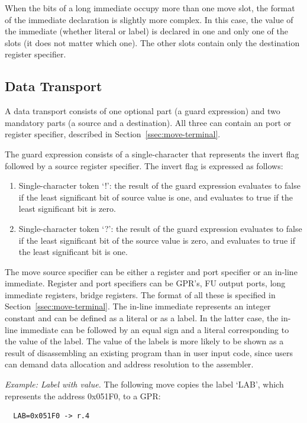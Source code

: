 \documentclass[a4paper,twoside]{tceusermanual}
\begin{document}
When the bits of a long immediate occupy more than one move slot, the format
of the immediate declaration is slightly more complex.  In this case, the
value of the immediate (whether literal or label) is declared in one and
only one of the slots (it does not matter which one). The other slots
contain only the destination register specifier.

\subsection{Data Transport}

A data transport consists of one optional part (a guard expression) and two
mandatory parts (a source and a destination). All three can contain an port
or register specifier, described in Section~\ref{ssec:move-terminal}.

The guard expression consists of a single-character that represents the
invert flag followed by a source register specifier. The invert flag is
expressed as follows:
\begin{enumerate}
\item %
  Single-character token `!': the result of the guard expression evaluates
  to false if the least significant bit of source value is one, and evaluates
  to true if the least significant bit is zero.
\item %
  Single-character token `?': the result of the guard expression evaluates
  to false if the least significant bit of the source value is zero, and
  evaluates to true if the least significant bit is one.
\end{enumerate}

The move source specifier can be either a register and port specifier or an
in-line immediate. Register and port specifiers can be GPR's, FU output
ports, long immediate registers, bridge registers. The format of all these
is specified in Section~\ref{ssec:move-terminal}.
%
The in-line immediate represents an integer constant and can be defined as a
literal or as a label. In the latter case, the in-line immediate can be
followed by an equal sign and a literal corresponding to the value of the
label.  The value of the labels is more likely to be shown as a result of
disassembling an existing program than in user input code, since users can
demand data allocation and address resolution to the assembler.

\emph{Example: Label with value.}
%
The following move copies the label `LAB', which represents the address
0x051F0, to a GPR:
\begin{verbatim}
  LAB=0x051F0 -> r.4
\end{verbatim}
\end{document}
